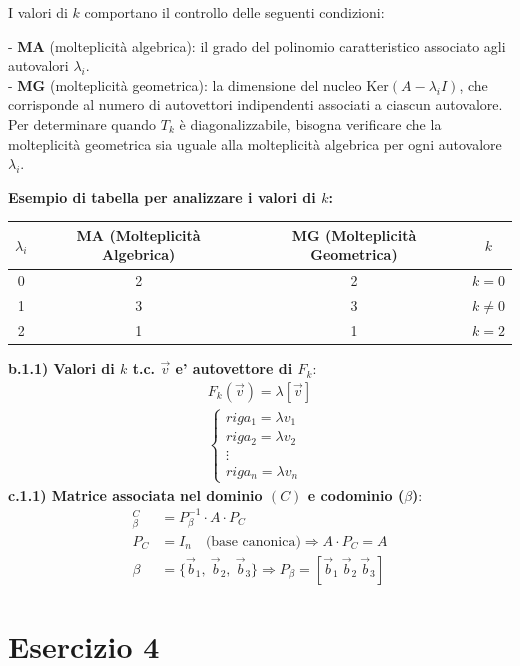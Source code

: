 \documentclass[a4paper,12pt]{article}
\begin{document}
I valori di \( k \) comportano il controllo delle seguenti condizioni:

- \textbf{MA} (molteplicità algebrica): il grado del polinomio caratteristico associato agli autovalori \( \lambda_i \). \\
- \textbf{MG} (molteplicità geometrica): la dimensione del nucleo \( \text{Ker}(A - \lambda_i I) \), che corrisponde al numero di autovettori indipendenti associati a ciascun autovalore. \\

Per determinare quando \( T_k \) è diagonalizzabile, bisogna verificare che la molteplicità geometrica sia uguale alla molteplicità algebrica per ogni autovalore \( \lambda_i \).

\textbf{Esempio di tabella per analizzare i valori di \( k \):}

\begin{tabular}{|c|c|c|c|}
    \hline
    \( \lambda_i \) & MA (Molteplicità Algebrica) & MG (Molteplicità Geometrica) & \( k \) \\
    \hline
    0 & 2 & 2 & \( k=0 \) \\
    \hline
    1 & 3 & 3 & \( k \neq 0 \) \\
    \hline
    2 & 1 & 1 & \( k=2 \) \\
    \hline
\end{tabular}
\vspace{1em}

\textbf{b.1.1) Valori di $k$ t.c. $\vec{v}$ e' autovettore di $F_k$}:
\begin{align}
    F_k(\vec{v})=\lambda[\vec{v}] \\
    \begin{cases}
        riga_1=\lambda v_1 \\
        riga_2=\lambda v_2\\
        \vdots \\
        riga_n=\lambda v_n
    \end{cases}
\end{align}
\textbf{c.1.1) Matrice associata nel dominio $(C)$ e codominio ($\beta$)}: 
\begin{align}
    [M]_{\beta}^{C} &= P_{\beta}^{-1} \cdot A \cdot P_C \\
    P_C &= I_n \quad \text{(base canonica)} \Rightarrow A \cdot P_C = A \\
    \beta &= \{ \vec{b}_1,\ \vec{b}_2,\ \vec{b}_3 \} \Rightarrow P_{\beta} = [\vec{b}_1\ \vec{b}_2\ \vec{b}_3]
\end{align}
\pagebreak
\section*{Esercizio 4}
\end{document}
